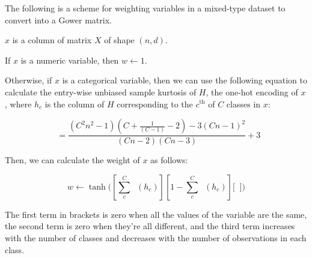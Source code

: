 \documentclass[11pt]{article}
\DeclareMathOperator{\Var}{\widehat{Var}}
\DeclareMathOperator{\Kurt}{\widehat{Kurtosis}}
\begin{document}
    The following is a scheme for weighting variables in a mixed-type dataset to convert into a Gower
    matrix.

    $x$ is a column of matrix $X$ of shape $\left(n,d\right)$.

    If $x$ is a numeric variable, then $w\leftarrow1$.

    Otherwise, if $x$ is a categorical variable, then we can use the following equation to calculate the entry-wise
    unbiased sample kurtosis of $H$, the one-hot encoding of $x$, where $h_c$ is the column of $H$ corresponding to the
    $c^{\text{th}}$ of $C$ classes in $x$:

    \begin{equation}
        \Kurt=\frac{(C^2n^2-1)(C+\frac{1}{(C-1)}-2)-3(Cn-1)^2}{(Cn-2)(Cn-3)}+3 \label{eq:kurtosis}
    \end{equation}

    Then, we can calculate the weight of $x$ as follows:

    \begin{equation}
        w\leftarrow\tanh{\Biggl(
        \left[\sum_c^C{\Var(h_c)}\right]
        \left[1-\sum_c^C{\Var(h_c)}\right]
        \Biggl[\Kurt\Biggr]
        \label{eq:equation}\Biggr)}
    \end{equation}



    The first term in brackets is zero when all the values of the variable are the same, the second term is zero when
    they're all different, and the third term increases with the number of classes and decreases with the number of
    observations in each class.
\end{document}
